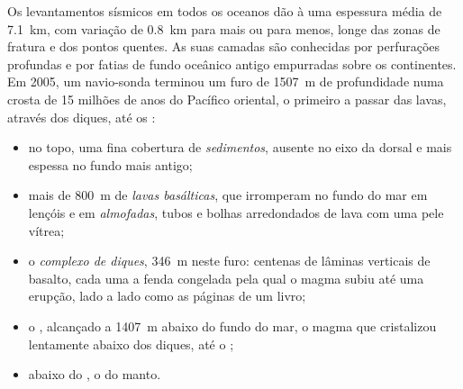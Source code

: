 Os levantamentos sísmicos em todos os oceanos dão à  uma
espessura média de \qty{7.1}{km}, com variação de \qty{0.8}{km} para mais
ou para menos, longe das zonas de fratura e dos pontos quentes. As suas
camadas são conhecidas por perfurações profundas e por fatias de fundo
oceânico antigo empurradas sobre os continentes. Em 2005, um navio-sonda
terminou um furo de \qty{1507}{m} de profundidade numa crosta de 15 milhões
de anos do Pacífico oriental, o primeiro a passar das lavas, através dos
diques, até os :

\begin{itemize}
  \item no topo, uma fina cobertura de \emph{sedimentos}, ausente no eixo da
        dorsal e mais espessa no fundo mais antigo;
  \item mais de \qty{800}{m} de \emph{lavas basálticas}, que irromperam no
        fundo do mar em lençóis e em \emph{almofadas}, tubos e bolhas
        arredondados de lava com uma pele vítrea;
  \item o \emph{complexo de diques}, \qty{346}{m} neste furo: centenas de
        lâminas verticais de basalto, cada uma a fenda congelada pela qual o
        magma subiu até uma erupção, lado a lado como as páginas de um livro;
  \item o \emph{}, alcançado a \qty{1407}{m} abaixo do fundo do mar, o
        magma que cristalizou lentamente abaixo dos diques, até o ;
  \item abaixo do , o \emph{} do manto.
\end{itemize}

